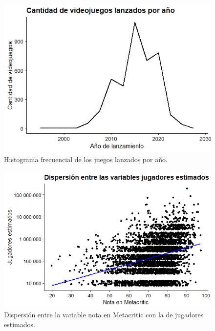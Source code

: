 \documentclass[
  letterpaper,
  DIV=11,
  numbers=noendperiod]{scrreprt}
\begin{document}
\begin{figure}

{\centering \includegraphics[width=137mm,height=\textheight]{./FreqGamesPerYear.png}

}

\caption{Histograma frecuencial de los juegos lanzados por año.}

\end{figure}

\begin{figure}

{\centering \includegraphics[width=138mm,height=\textheight]{./imagenes/GamersAndCriticsRelations.png}

}

\caption{Dispersión entre la variable nota en Metacritic con la de
jugadores estimados.}

\end{figure}
\end{document}
